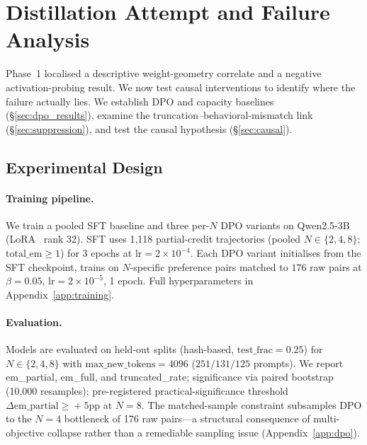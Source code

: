 \section{Distillation Attempt and Failure Analysis}
\label{sec:distillation}

Phase~1 localised a descriptive weight-geometry correlate and a negative activation-probing result. We now test causal interventions to identify where the failure actually lies. We establish DPO and capacity baselines (\S\ref{sec:dpo_results}), examine the truncation--behavioral-mismatch link (\S\ref{sec:suppression}), and test the causal hypothesis (\S\ref{sec:causal}).

\subsection{Experimental Design}
\label{sec:distill_design}

\paragraph{Training pipeline.}
We train a pooled SFT baseline and three per-$N$ DPO variants on Qwen2.5-3B (LoRA~\cite{hu2022lora} rank 32). SFT uses 1{,}118 partial-credit trajectories (pooled $N\!\in\!\{2,4,8\}$; $\text{total\_em}\!\geq\!1$) for 3 epochs at $\text{lr}\!=\!2\!\times\!10^{-4}$. Each DPO variant initialises from the SFT checkpoint, trains on $N$-specific preference pairs matched to $176$ raw pairs at $\beta\!=\!0.05$, $\text{lr}\!=\!2\!\times\!10^{-5}$, 1 epoch. Full hyperparameters in Appendix~\ref{app:training}.

\paragraph{Evaluation.}
Models are evaluated on held-out splits (hash-based, $\text{test\_frac}=0.25$) for $N\!\in\!\{2,4,8\}$ with $\text{max\_new\_tokens}=4096$ ($251/131/125$ prompts). We report em\_partial, em\_full, and truncated\_rate; significance via paired bootstrap (10{,}000 resamples); pre-registered practical-significance threshold $\Delta\text{em\_partial}\!\geq\!+5$pp at $N\!=\!8$. The matched-sample constraint subsamples DPO to the $N\!=\!4$ bottleneck of 176 raw pairs---a structural consequence of multi-objective collapse rather than a remediable sampling issue (Appendix~\ref{app:dpo}).


